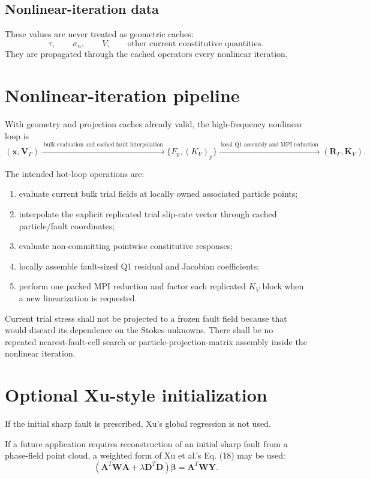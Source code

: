 \documentclass[11pt]{article}
\begin{document}
\subsection{Nonlinear-iteration data}
These values are never treated as geometric caches:
\[
\tau,\qquad\sigma_n,\qquad V,\qquad
\text{other current constitutive quantities}.
\]
They are propagated through the cached operators every nonlinear iteration.

\section{Nonlinear-iteration pipeline}

With geometry and projection caches already valid, the high-frequency nonlinear loop is
\[
\boxed{
(\mathbf{x},\mathbf{V}_\Gamma)
\xrightarrow{\;\text{bulk evaluation and cached fault interpolation}\;}
\{F_p,(K_V)_p\}
\xrightarrow{\;\text{local Q1 assembly and MPI reduction}\;}
(\mathbf{R}_\Gamma,\mathbf{K}_V).
}
\]

The intended hot-loop operations are:
\begin{enumerate}
  \item evaluate current bulk trial fields at locally owned associated
        particle points;
  \item interpolate the explicit replicated trial slip-rate vector through
        cached particle/fault coordinates;
  \item evaluate non-committing pointwise constitutive responses;
  \item locally assemble fault-sized Q1 residual and Jacobian coefficients;
  \item perform one packed MPI reduction and factor each replicated $K_V$
        block when a new linearization is requested.
\end{enumerate}

Current trial stress shall not be projected to a frozen fault field because
that would discard its dependence on the Stokes unknowns.  There shall be no
repeated nearest-fault-cell search or particle-projection-matrix assembly
inside the nonlinear iteration.

\section{Optional Xu-style initialization}

If the initial sharp fault is prescribed, Xu's global regression is not used.

If a future application requires reconstruction of an initial sharp fault from a phase-field point cloud, a weighted form of Xu et al.'s Eq. (18) may be used:
\[
(\mathbf{A}^T\mathbf{W}\mathbf{A}+\lambda\mathbf{D}^T\mathbf{D})\boldsymbol\beta
=
\mathbf{A}^T\mathbf{W}\mathbf{Y}.
\]
\end{document}
